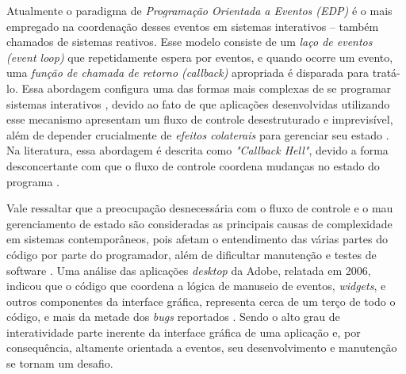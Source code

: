 Atualmente o paradigma de \emph{Programação Orientada a Eventos
(EDP)} é o mais empregado na
coordenação desses eventos em sistemas interativos
-- também chamados de sistemas reativos.
Esse modelo consiste de um \emph{laço de eventos (event loop)}
que repetidamente espera por eventos, e quando ocorre um
evento, uma \emph{função de chamada de retorno (callback)}
apropriada é disparada para tratá-lo.
Essa abordagem configura uma das formas mais complexas de se
programar sistemas interativos \cite{
  edwards2009coherent,
  fischer2007tasks,
  maier2010deprecating,
  reppy1992higher},
devido ao fato de que aplicações desenvolvidas utilizando
esse mecanismo apresentam um fluxo de controle desestruturado
e imprevisível, além de depender crucialmente de
\emph{efeitos colaterais\footnotemark} para
gerenciar seu estado \cite{
  meyerovich2009flapjax,
  muller2015interactive,
  muller2015practical}.
Na literatura, essa abordagem é descrita como \emph{"Callback Hell"},
devido a forma desconcertante com que o fluxo de controle coordena
mudanças no estado do programa \cite[p.~2]{edwards2009coherent}.

Vale ressaltar que a preocupação desnecessária com o
fluxo de controle e o mau gerenciamento de estado são
consideradas as principais causas de complexidade em
sistemas contemporâneos, pois afetam o entendimento das
várias partes do código por parte do programador,
além de dificultar manutenção e testes de software
\cite{moseley06out}.
Uma análise das aplicações \emph{desktop} da Adobe,
relatada em 2006, indicou que o código que coordena a
lógica de manuseio de eventos, \emph{widgets}, e outros
componentes da interface gráfica, representa cerca de
um terço de todo o código, e mais da metade dos \emph{bugs}
reportados \cite{jarvi2008property}.
Sendo o alto grau de interatividade parte inerente da
interface gráfica de uma aplicação e, por consequência,
altamente orientada a eventos, seu desenvolvimento e
manutenção se tornam um desafio.

